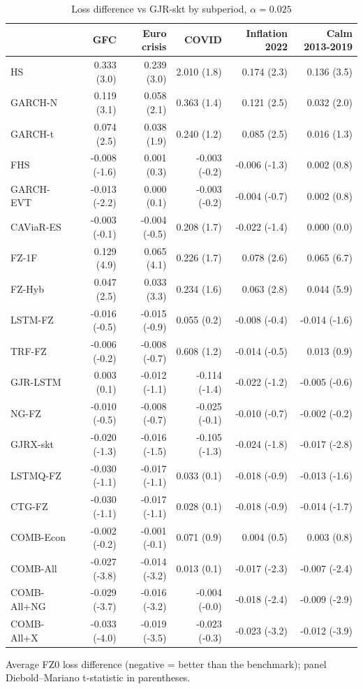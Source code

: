 \begin{table}[htbp]
\centering
\footnotesize
\caption{Loss difference vs GJR-skt by subperiod, $\alpha=0.025$}
\label{tab:sub}
\begin{tabular}{lrrrrr}
\toprule
 & GFC & Euro crisis & COVID & Inflation 2022 & Calm 2013-2019 \\
\midrule
HS & 0.333 (3.0) & 0.239 (3.0) & 2.010 (1.8) & 0.174 (2.3) & 0.136 (3.5) \\
GARCH-N & 0.119 (3.1) & 0.058 (2.1) & 0.363 (1.4) & 0.121 (2.5) & 0.032 (2.0) \\
GARCH-t & 0.074 (2.5) & 0.038 (1.9) & 0.240 (1.2) & 0.085 (2.5) & 0.016 (1.3) \\
FHS & -0.008 (-1.6) & 0.001 (0.3) & -0.003 (-0.2) & -0.006 (-1.3) & 0.002 (0.8) \\
GARCH-EVT & -0.013 (-2.2) & 0.000 (0.1) & -0.003 (-0.2) & -0.004 (-0.7) & 0.002 (0.8) \\
CAViaR-ES & -0.003 (-0.1) & -0.004 (-0.5) & 0.208 (1.7) & -0.022 (-1.4) & 0.000 (0.0) \\
FZ-1F & 0.129 (4.9) & 0.065 (4.1) & 0.226 (1.7) & 0.078 (2.6) & 0.065 (6.7) \\
FZ-Hyb & 0.047 (2.5) & 0.033 (3.3) & 0.234 (1.6) & 0.063 (2.8) & 0.044 (5.9) \\
LSTM-FZ & -0.016 (-0.5) & -0.015 (-0.9) & 0.055 (0.2) & -0.008 (-0.4) & -0.014 (-1.6) \\
TRF-FZ & -0.006 (-0.2) & -0.008 (-0.7) & 0.608 (1.2) & -0.014 (-0.5) & 0.013 (0.9) \\
GJR-LSTM & 0.003 (0.1) & -0.012 (-1.1) & -0.114 (-1.4) & -0.022 (-1.2) & -0.005 (-0.6) \\
NG-FZ & -0.010 (-0.5) & -0.008 (-0.7) & -0.025 (-0.1) & -0.010 (-0.7) & -0.002 (-0.2) \\
GJRX-skt & -0.020 (-1.3) & -0.016 (-1.5) & -0.105 (-1.3) & -0.024 (-1.8) & -0.017 (-2.8) \\
LSTMQ-FZ & -0.030 (-1.1) & -0.017 (-1.1) & 0.033 (0.1) & -0.018 (-0.9) & -0.013 (-1.6) \\
CTG-FZ & -0.030 (-1.1) & -0.017 (-1.1) & 0.028 (0.1) & -0.018 (-0.9) & -0.014 (-1.7) \\
COMB-Econ & -0.002 (-0.2) & -0.001 (-0.1) & 0.071 (0.9) & 0.004 (0.5) & 0.003 (0.8) \\
COMB-All & -0.027 (-3.8) & -0.014 (-3.2) & 0.013 (0.1) & -0.017 (-2.3) & -0.007 (-2.4) \\
COMB-All+NG & -0.029 (-3.7) & -0.016 (-3.2) & -0.004 (-0.0) & -0.018 (-2.4) & -0.009 (-2.9) \\
COMB-All+X & -0.033 (-4.0) & -0.019 (-3.5) & -0.023 (-0.3) & -0.023 (-3.2) & -0.012 (-3.9) \\
\bottomrule
\end{tabular}
\par\smallskip\parbox{\linewidth}{\scriptsize Average FZ0 loss difference (negative = better than the benchmark); panel Diebold--Mariano t-statistic in parentheses.}
\end{table}